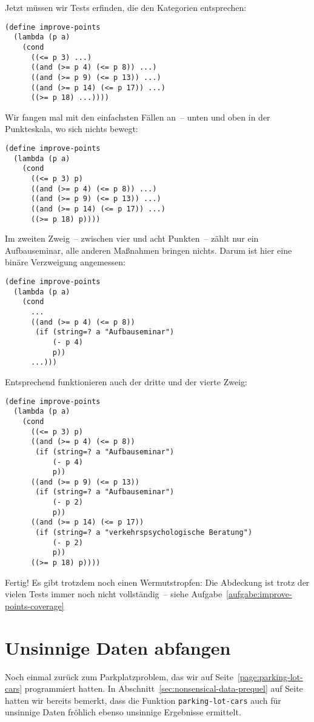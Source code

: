 %
Jetzt müssen wir Tests erfinden, die den Kategorien entsprechen:
%
\begin{verbatim}
(define improve-points
  (lambda (p a)
    (cond
      ((<= p 3) ...)
      ((and (>= p 4) (<= p 8)) ...)
      ((and (>= p 9) (<= p 13)) ...)
      ((and (>= p 14) (<= p 17)) ...)
      ((>= p 18) ...))))
\end{verbatim}
%
Wir fangen mal mit den einfachsten Fällen an~-- unten und oben in der
Punkteskala, wo sich nichts bewegt:
%
\begin{verbatim}
(define improve-points
  (lambda (p a)
    (cond
      ((<= p 3) p)
      ((and (>= p 4) (<= p 8)) ...)
      ((and (>= p 9) (<= p 13)) ...)
      ((and (>= p 14) (<= p 17)) ...)
      ((>= p 18) p))))
\end{verbatim}
%
Im zweiten Zweig~-- zwischen vier und acht Punkten~-- zählt nur ein
Aufbauseminar, alle anderen Maßnahmen bringen nichts.  Darum ist hier
eine binäre Verzweigung angemessen:
%
\begin{verbatim}
(define improve-points
  (lambda (p a)
    (cond
      ...
      ((and (>= p 4) (<= p 8))
       (if (string=? a "Aufbauseminar")
           (- p 4)
           p))
      ...)))
\end{verbatim}
%
Entsprechend funktionieren auch der dritte und der vierte Zweig:
%
\begin{verbatim}
(define improve-points
  (lambda (p a)
    (cond
      ((<= p 3) p)
      ((and (>= p 4) (<= p 8))
       (if (string=? a "Aufbauseminar")
           (- p 4)
           p))
      ((and (>= p 9) (<= p 13))
       (if (string=? a "Aufbauseminar")
           (- p 2)
           p))
      ((and (>= p 14) (<= p 17))
       (if (string=? a "verkehrspsychologische Beratung")
           (- p 2)
           p))
      ((>= p 18) p))))
\end{verbatim}
%
Fertig!  Es gibt trotzdem noch einen Wermutstropfen: Die Abdeckung ist
trotz der vielen Tests immer noch nicht vollständig~-- siehe
Aufgabe~\ref{aufgabe:improve-points-coverage}

\section{Unsinnige Daten abfangen}
\label{sec:nonsensical-data}

Noch einmal zurück zum Parkplatzproblem, das wir auf
Seite~\ref{page:parking-lot-cars} programmiert hatten.  In
Abschnitt~\ref{sec:nonsensical-data-prequel} auf
Seite~\pageref{sec:nonsensical-data-prequel} hatten wir bereits
bemerkt, dass die Funktion
\texttt{parking-lot-cars}
auch für unsinnige Daten fröhlich ebenso unsinnige Ergebnisse
ermittelt.

